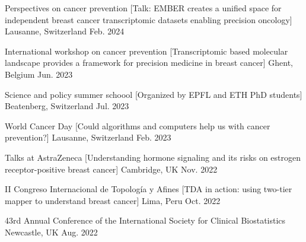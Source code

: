 
\begin{cvhonors}

\cvhonor
  {Perspectives on cancer prevention} %
  [Talk: EMBER creates a unified space for independent breast cancer transcriptomic datasets enabling precision oncology] %
  {Lausanne, Switzerland} %
  {Feb. 2024} %



\cvhonor
  {International workshop on cancer prevention} %
  [Transcriptomic based molecular landscape provides a framework for precision medicine in breast cancer] %
  {Ghent, Belgium} %
  {Jun. 2023} %


\cvhonor 
  {Science and policy summer schoool} %
  [Organized by EPFL and ETH PhD students] %
  {Beatenberg, Switzerland} %
  {Jul. 2023} %


\cvhonor 
  {World Cancer Day} %
  [Could algorithms and computers help us with cancer prevention?] %
  {Lausanne, Switzerland} %
  {Feb. 2023} %

\cvhonor 
  {Talks at AstraZeneca} %
  [Understanding hormone signaling and its risks on estrogen receptor-positive breast cancer] %
  {Cambridge, UK} %
  {Nov. 2022} %

\cvhonor
  {II Congreso Internacional de Topología y Afines} %
  [TDA in action: using two-tier mapper to understand breast cancer] %
  {Lima, Peru} %
  {Oct. 2022} %


\cvhonor
  {43rd Annual Conference of the International Society for Clinical Biostatistics} %
  {Newcastle, UK} %
  {Aug. 2022} %


\end{cvhonors}
